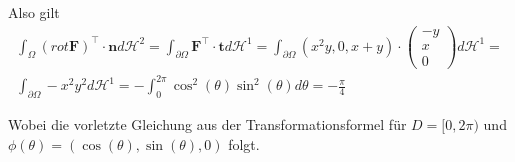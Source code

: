 \documentclass[]{article}
\begin{document}
Also gilt
\begin{align*}
	\int_\Omega (rot\bm{F})^\top \cdot \bm{n} d\mathcal{H}^2 = \int_{\partial\Omega} \bm{F}^\top \cdot \bm{t} d\mathcal{H}^1 = \int_{\partial\Omega} (x^2y, 0, x+y) \cdot \begin{pmatrix} -y\\ x\\ 0 \end{pmatrix} d\mathcal{H}^1 =\\
	\int_{\partial\Omega} -x^2y^2 d\mathcal{H}^1 = -\int_{0}^{2\pi} \cos^2(\theta) \sin^2(\theta) d\theta = -\frac{\pi}{4}
\end{align*}

Wobei die vorletzte Gleichung aus der Transformationsformel für $D=[0,2\pi)$ und $\phi(\theta)=(\cos(\theta), \sin(\theta), 0)$ folgt.
\end{document}
